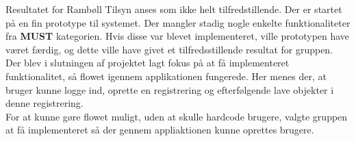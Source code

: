 Resultatet for Rambøll Tilsyn anses som ikke helt tilfredstillende. 
Der er startet på en fin prototype til systemet. Der mangler stadig nogle enkelte funktionaliteter fra \textbf{MUST} kategorien. Hvis disse var blevet implementeret, ville prototypen have været færdig, og dette ville have givet et tilfredsstillende resultat for gruppen. \\
Der blev i slutningen af projektet lagt fokus på at få implementeret funktionalitet, så flowet igennem applikationen fungerede. Her menes der, at bruger kunne logge ind, oprette en registrering og efterfølgende lave objekter i denne registrering. \\
For at kunne gøre flowet muligt, uden at skulle hardcode brugere, valgte gruppen at få implementeret så der gennem appliaktionen kunne oprettes brugere.